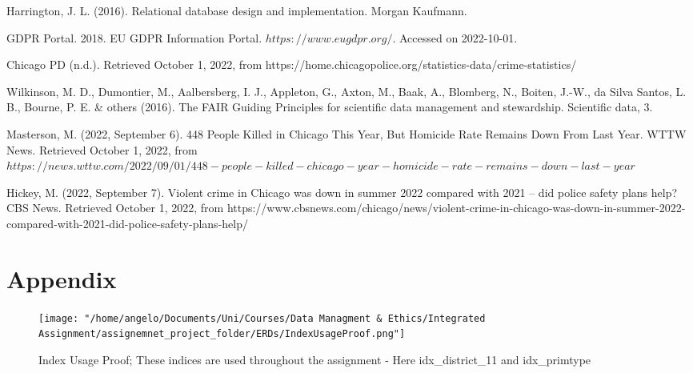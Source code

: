 \documentclass[a4paper]{article}
\begin{document}
\begin{thebibliography}{100} %
 Harrington, J. L. (2016). Relational database design and implementation. Morgan Kaufmann.

 GDPR Portal. 2018. EU GDPR Information Portal. $https://www.eugdpr.org/$. Accessed on 2022-10-01.

 Chicago PD (n.d.). Retrieved October 1, 2022, from https://home.chicagopolice.org/statistics-data/crime-statistics/

 Wilkinson, M. D., Dumontier, M., Aalbersberg, I. J., Appleton, G., Axton, M., Baak, A., Blomberg, N., Boiten, J.-W., da Silva Santos, L. B., Bourne, P. E. \& others (2016). The FAIR Guiding Principles for scientific data management and stewardship. Scientific data, 3.

 Masterson, M. (2022, September 6). 448 People Killed in Chicago This Year, But Homicide Rate Remains Down From Last Year. WTTW News. Retrieved October 1, 2022, from $https://news.wttw.com/2022/09/01/448-people-killed-chicago-year-homicide-rate-remains-down-last-year$

 Hickey, M. (2022, September 7). Violent crime in Chicago was down in summer 2022 compared with 2021 -- did police safety plans help? CBS News. Retrieved October 1, 2022, from https://www.cbsnews.com/chicago/news/violent-crime-in-chicago-was-down-in-summer-2022-compared-with-2021-did-police-safety-plans-help/


\end{thebibliography}




\section{Appendix}
\begin{figure}[htp]
		\centering
			\texttt{[image: "/home/angelo/Documents/Uni/Courses/Data Managment \& Ethics/Integrated Assignment/assignemnet\_project\_folder/ERDs/IndexUsageProof.png"]}
         \small
         \caption{Index Usage Proof; These indices are used throughout the assignment - Here idx\_district\_11 and idx\_primtype}
\end{figure}
\end{document}
